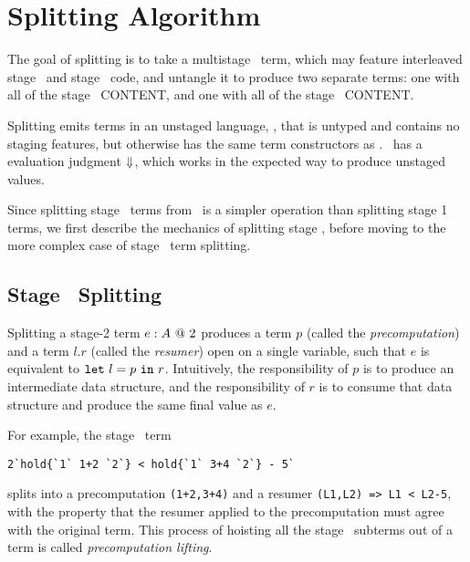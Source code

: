 
\section{Splitting Algorithm}
\label{sec:splitting}


The goal of splitting is to take a multistage \lang\ term,
which may feature interleaved stage \bbone\ and stage \bbtwo\ code,
and untangle it to produce two separate terms:
one with all of the stage \bbone\ CONTENT, and one with all of
the stage \bbtwo\ CONTENT.

Splitting emits terms in an unstaged language, \langmono, that is 
untyped and contains no staging features, but otherwise has the same term constructors as \lang. 
\langmono\ has a evaluation judgment ${\Downarrow}$, which works in the expected way to produce unstaged values.

Since splitting stage \bbtwo\ terms from \lang\ is a simpler operation than splitting stage 1 terms,
we first describe the mechanics of splitting stage \bbtwo, before moving to the more complex
case of stage \bbone\ term splitting.



\subsection {Stage \bbtwo\ Splitting}


Splitting a stage-2 term ${e}:{A}~@~ 2$ produces a term
$p$ (called the {\em precomputation}) and a term $l.r$ (called the {\em resumer})
open on a single variable, such that $e$ is equivalent to ${\tt let}~{l} = {p}~{\tt in}~{r}$.
Intuitively, the responsibility of $p$ is to produce an intermediate data structure, 
and the responsibility of $r$ is to consume that data structure and produce the same final value as $e$.

 For example, the stage \bbtwo\ term
\begin{lstlisting}
2`hold{`1` 1+2 `2`} < hold{`1` 3+4 `2`} - 5`
\end{lstlisting}
splits into a precomputation \verb|(1+2,3+4)| and a resumer
\verb|(L1,L2) => L1 < L2-5|, with the property that the resumer applied to
the precomputation must agree with the original term. This process of hoisting
all the stage \bbone\ subterms out of a term is called \emph{precomputation lifting}.

